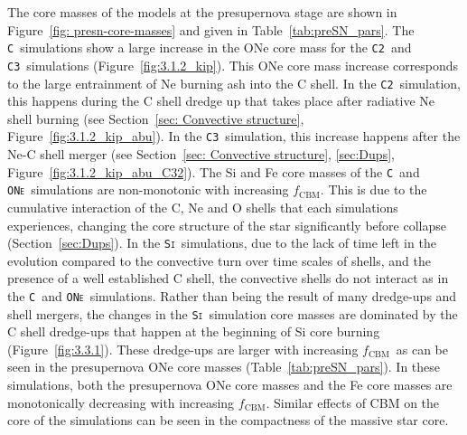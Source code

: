 \documentclass[useAMS,usenatbib]{mn2e}
\newcommand{\fcbm}{\ensuremath{f_\mathrm{CBM}}}
\newcommand{\Cb}{\textsc{\texttt{C2}}}
\newcommand{\Cc}{\textsc{\texttt{C3}}}
\newcommand{\C}{\textsc{\texttt{C}}}
\newcommand{\ONe}{\textsc{\texttt{ONe}}}
\newcommand{\Si}{\textsc{\texttt{Si}}}
\begin{document}
The core masses of the models at the presupernova stage are shown in
Figure~\ref{fig: presn-core-masses} and given in Table~\ref{tab:preSN_pars}.
The \C\ simulations show a large increase in the ONe core mass for the \Cb\ and 
\Cc\ simulations (Figure~\ref{fig:3.1.2_kip}). This ONe core mass increase corresponds to the large entrainment of 
Ne burning ash into the C shell. In the \Cb\ simulation, this happens during the C shell
dredge up that takes place after radiative Ne shell burning (see 
Section~\ref{sec: Convective structure}, Figure~\ref{fig:3.1.2_kip_abu}). In the \Cc\ simulation, this increase happens 
after the Ne-C shell merger (see Section~\ref{sec: Convective structure}, \ref{sec:Dups}, Figure~\ref{fig:3.1.2_kip_abu_C32}). The Si and Fe core masses 
of the \C\ and \ONe\ simulations are non-monotonic with increasing \fcbm. This is 
due to the cumulative interaction of the C, Ne and O shells that each simulations 
experiences, changing the core structure of the star significantly before collapse 
(Section~\ref{sec:Dups}). In the \Si\ simulations, due to the lack of time left in the evolution compared to the convective turn over time scales of shells, and the presence of a well established C shell, the convective shells do not interact as in the \C\ and \ONe\ simulations. Rather than being the result of many dredge-ups and shell mergers, the changes in the \Si\ simulation core masses are dominated by the C shell dredge-ups that happen at the beginning of Si core burning (Figure~\ref{fig:3.3.1}). These dredge-ups are larger with increasing \fcbm\ as can be seen in the presupernova ONe core masses (Table~\ref{tab:preSN_pars}).  In these simulations, both the presupernova ONe core masses and the Fe core masses are monotonically decreasing with increasing \fcbm. Similar effects of CBM on the core of the simulations can be seen in the compactness of the massive star core.
\end{document}

